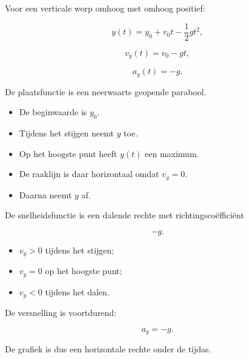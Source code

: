 \documentclass{ximera}
\begin{document}


Voor een verticale worp omhoog met omhoog positief:

\[
y(t)=y_0+v_0t-\frac12gt^2,
\]

\[
v_y(t)=v_0-gt,
\]

\[
a_y(t)=-g.
\]



De plaatsfunctie is een neerwaarts geopende parabool.

\begin{itemize}
  \item De beginwaarde is $y_0$.
  \item Tijdens het stijgen neemt $y$ toe.
  \item Op het hoogste punt heeft $y(t)$ een maximum.
  \item De raaklijn is daar horizontaal omdat $v_y=0$.
  \item Daarna neemt $y$ af.
\end{itemize}



De snelheidsfunctie is een dalende rechte met richtingscoëfficiënt

\[
-g.
\]

\begin{itemize}
  \item $v_y>0$ tijdens het stijgen;
  \item $v_y=0$ op het hoogste punt;
  \item $v_y<0$ tijdens het dalen.
\end{itemize}



De versnelling is voortdurend:

\[
a_y=-g.
\]

De grafiek is dus een horizontale rechte onder de tijdas.
\end{document}
